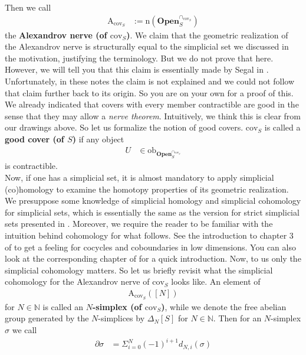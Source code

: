 Then we call
\begin{align*}
  \mathrm{A}_{\mathrm{cov}_{S}}
  &:=
  \mathrm{n}
  \left(
    \mathbf{Open}_{S}^{\cap_{\mathrm{cov}_{S}}}
  \right)
\end{align*}
the \textbf{Alexandrov nerve (of $\mathrm{cov}_{S}$)}.
We claim that the geometric realization of the Alexandrov nerve is structurally equal to the simplicial set we discussed in the motivation, justifying the terminology.
But we do not prove that here.
However, we will tell you that this claim is essentially made by Segal in \cite{6d9ad807}.
Unfortunately, in these notes the claim is not explained and we could not follow that claim further back to its origin.
So you are on your own for a proof of this.
\\
We already indicated that covers with every member contractible are good in the sense that they may allow a \textit{nerve theorem}.
Intuitively, we think this is clear from our drawings above.
So let us formalize the notion of good covers.
$\mathrm{cov}_{S}$ is called a \textbf{good cover (of $S$)} if any object
\begin{align*}
  U
  &\in
  \mathrm{ob}_{\mathbf{Open}_{S}^{\cap_{\mathrm{cov}_{S}}}}
\end{align*}
is contractible.
\\
Now, if one has a simplicial set, it is almost mandatory to apply simplicial (co)homology to examine the homotopy properties of its geometric realization.
We presuppose some knowledge of simplicial homology and simplicial cohomology for simplicial sets, which is essentially the same as the version for strict simplicial sets presented in \cite{8b5861fc}.
Moreover, we require the reader to be familiar with the intuition behind cohomology for what follows.
See the introduction to chapter 3 of \cite{8b5861fc} to get a feeling for cocycles and coboundaries in low dimensions.
You can also look at the corresponding chapter of \cite{00000011} for a quick introduction.
Now, to us only the simplicial cohomology matters.
So let us briefly revisit what the simplicial cohomology for the Alexandrov nerve of $\mathrm{cov}_{S}$ looks like.
An element of
\begin{align*}
  \mathrm{A}_{\mathrm{cov}_{S}}
  ([N])
\end{align*}
for $N \in \mathbb{N}$ is called an \textbf{$N$-simplex (of $\mathrm{cov}_{S}$)}, while we denote the free abelian group generated by the $N$-simplices by $\Delta_{N}[S]$ for $N \in \mathbb{N}$.
Then for an $N$-simplex $\sigma$ we call
\begin{align*}
  \partial
  \sigma
  &=
  \Sigma_{i=0}^{N}
  (-1)^{i+1}
  d_{N,i}(\sigma)
\end{align*}
